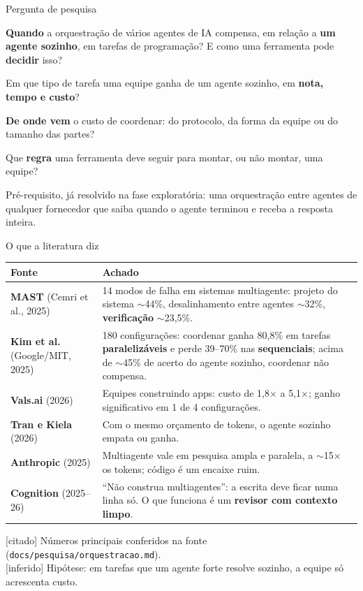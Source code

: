 \documentclass[11pt,aspectratio=169]{beamer}
\newcommand{\ev}[2]{{\scriptsize\sffamily\colorbox{#1!12}{\textcolor{#1!80!black}{[#2]}}}}
\newcommand{\citado}{\ev{suave}{citado}}
\newcommand{\inferido}{\ev{alerta}{inferido}}
\begin{document}
\begin{frame}{Pergunta de pesquisa}
\begin{block}{}
\large \textbf{Quando} a orquestração de vários agentes de IA compensa, em relação a \textbf{um agente
sozinho}, em tarefas de programação? E como uma ferramenta pode \textbf{decidir} isso?
\end{block}
\vspace{0.6em}
\begin{description}[Q3]
\setlength\itemsep{0.35em}
\item[Q1] Em que tipo de tarefa uma equipe ganha de um agente sozinho, em \textbf{nota, tempo e custo}?
\item[Q2] \textbf{De onde vem} o custo de coordenar: do protocolo, da forma da equipe ou do tamanho das partes?
\item[Q3] Que \textbf{regra} uma ferramenta deve seguir para montar, ou não montar, uma equipe?
\end{description}
\vspace{0.4em}
{\small\color{suave} Pré-requisito, já resolvido na fase exploratória: uma orquestração entre agentes de qualquer
fornecedor que saiba quando o agente terminou e receba a resposta inteira.}
\end{frame}

\begin{frame}{O que a literatura diz}
\scriptsize
\begin{tabularx}{\linewidth}{@{}l X@{}}
\toprule
Fonte & Achado \\
\midrule
\textbf{MAST} (Cemri et al., 2025) & 14 modos de falha em sistemas multiagente: projeto do sistema $\sim$44\%,
  desalinhamento entre agentes $\sim$32\%, \textbf{verificação} $\sim$23,5\%. \\
\textbf{Kim et al.} (Google/MIT, 2025) & 180 configurações: coordenar ganha 80,8\% em tarefas
  \textbf{paralelizáveis} e perde 39--70\% nas \textbf{sequenciais}; acima de $\sim$45\% de acerto do agente
  sozinho, coordenar não compensa. \\
\textbf{Vals.ai} (2026) & Equipes construindo apps: custo de 1,8$\times$ a 5,1$\times$; ganho significativo em
  1 de 4 configurações. \\
\textbf{Tran e Kiela} (2026) & Com o mesmo orçamento de tokens, o agente sozinho empata ou ganha. \\
\textbf{Anthropic} (2025) & Multiagente vale em pesquisa ampla e paralela, a $\sim$15$\times$ os tokens; código
  é um encaixe ruim. \\
\textbf{Cognition} (2025--26) & ``Não construa multiagentes'': a escrita deve ficar numa linha só. O que funciona
  é um \textbf{revisor com contexto limpo}. \\
\bottomrule
\end{tabularx}
\vspace{0.5em}

{\footnotesize\citado{} Números principais conferidos na fonte (\texttt{docs/pesquisa/orquestracao.md}).\\
\inferido{} Hipótese: em tarefas que um agente forte resolve sozinho, a equipe só acrescenta custo.}
\end{frame}
\end{document}
